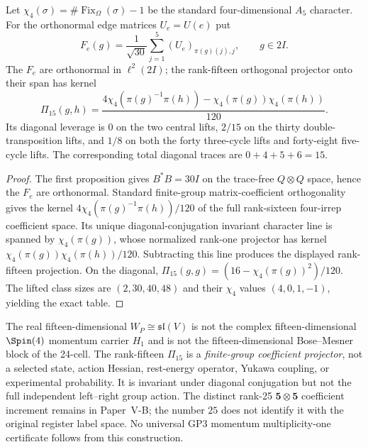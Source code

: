 \documentclass[11pt]{article}
\begin{document}
\begin{theorem}
\label{p1:thm:v339-petersen-projector-strata}
Let $\chi_4(\sigma)=\#\operatorname{Fix}_{\Omega}(\sigma)-1$
be the standard four-dimensional $A_5$ character. For the
orthonormal edge matrices $U_e=U(e)$ put
\[
 F_e(g)=\frac1{\sqrt{30}}\sum_{j=1}^5(U_e)_{\pi(g)(j),j},
 \qquad g\in2I.
\]
The $F_e$ are orthonormal in $\ell^2(2I)$; the rank-fifteen
orthogonal projector onto their span has kernel
\[
 \boxed{\Pi_{15}(g,h)=\frac{4\chi_4(\pi(g)^{-1}\pi(h))
                         -\chi_4(\pi(g))\chi_4(\pi(h))}{120}.}
\]
Its diagonal leverage is $0$ on the two central lifts, $2/15$
on the thirty double-transposition lifts, and $1/8$ on both
the forty three-cycle lifts and forty-eight five-cycle lifts.
The corresponding total diagonal traces are $0+4+5+6=15$.
\end{theorem}
\begin{proof}
The first proposition gives $B^*B=30I$ on the trace-free
$Q\otimes Q$ space, hence the $F_e$ are orthonormal. Standard
finite-group matrix-coefficient orthogonality gives the kernel
$4\chi_4(\pi(g)^{-1}\pi(h))/120$ of the full rank-sixteen
four-irrep coefficient space. Its unique diagonal-conjugation
invariant character line is spanned by $\chi_4(\pi(g))$,
whose normalized rank-one projector has kernel
$\chi_4(\pi(g))\chi_4(\pi(h))/120$. Subtracting this line
produces the displayed rank-fifteen projection. On the diagonal,
$\Pi_{15}(g,g)=(16-\chi_4(\pi(g))^2)/120$.
The lifted class sizes are $(2,30,40,48)$ and their
$\chi_4$ values $(4,0,1,-1)$, yielding the exact table.
\end{proof}
\begin{remark}
\label{p1:rem:v339-three-fifteens-firewall}
The real fifteen-dimensional $W_P\cong\mathfrak{sl}(V)$ is not
the complex fifteen-dimensional $\Spin(4)$ momentum carrier
$H_1$ and is not the fifteen-dimensional Bose--Mesner block of
the 24-cell. The rank-fifteen $\Pi_{15}$ is a \emph{finite-group
coefficient projector}, not a selected state, action Hessian,
rest-energy operator, Yukawa coupling, or experimental probability.
It is invariant under diagonal conjugation but not the full
independent left--right group action. The distinct rank-25
$\mathbf5\otimes\mathbf5$ coefficient increment remains in
Paper~V-B; the number $25$ does not identify it with the
original register label space. No universal GP3 momentum
multiplicity-one certificate follows from this construction.
\end{remark}
\end{document}
